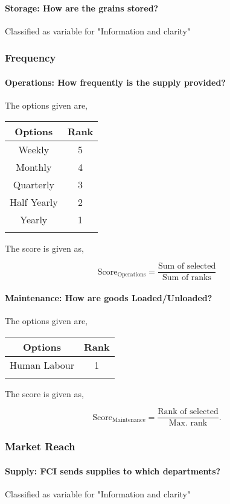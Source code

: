 \documentclass[oneside,twocolumn]{article}
\newcommand{\tsub}[2]{\text{#1}_{\text{#2}}}
\newcommand{\dsub}[2]{\dfrac{\text{#1}}{\text{#2}}}
\newcommand{\multsel}[1]
{
	\[
		\tsub{Score}{#1} = \dsub{Sum of selected}{Sum of ranks}
	\]
}
\newcommand{\singsel}[1]
{
	\[
		\tsub{Score}{#1} = \dsub{Rank of selected}{Max. rank}.
	\]
}
\newenvironment{ttable}
{
\begin{center}
\begin{tabular}{c|c}
\hline
}
{
\\ \hline
\end{tabular}
\end{center}
}
\begin{document}
\paragraph{Storage: How are the grains stored?}

Classified as variable for "Information and         clarity"
\subsubsection{Frequency}

\paragraph{Operations: How frequently is the supply provided?}

The options given are,
\begin{ttable}
Options & Rank \\ \hline
Weekly & 5 \\
Monthly & 4 \\
Quarterly & 3 \\
Half Yearly & 2 \\
Yearly & 1 \\
\hline
\end{ttable}
The score is given as,
\multsel{Operations}
\paragraph{Maintenance: How are goods Loaded/Unloaded?}

The options given are,
\begin{ttable}
Options & Rank \\ \hline
Human Labour & 1 \\
\hline
\end{ttable}
The score is given as,
\singsel{Maintenance}
\subsubsection{Market Reach}

\paragraph{Supply: FCI sends supplies to which departments?}

Classified as variable for "Information and         clarity"
\end{document}
